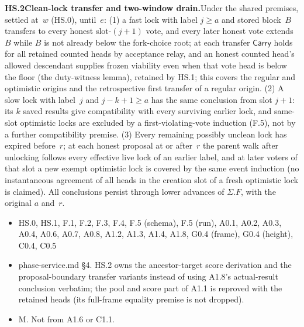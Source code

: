 \documentclass{article}
\newcommand{\dagnode}[6]{%
\par\medskip\noindent\textbf{#1\enspace #2.}\enspace #3
\begin{itemize}[leftmargin=2.2em,itemsep=0pt,topsep=2pt]
\item[\emph{Uses}] #4
\item[\emph{Evid.}] #5
\item[\emph{Task}] #6
\end{itemize}}
\begin{document}
\dagnode{HS.2}{Clean-lock transfer and two-window drain}{Under the shared
premises, settled at~$w$ (HS.0), until~$e$: (1) a fast lock with label
$j\geq a$ and stored block~$B$ transfers to every honest slot-$(j+1)$ vote,
and every later honest vote extends~$B$ while $B$ is not already below the
fork-choice root; at each transfer $\mathsf{Carry}$ holds for all retained
counted heads by acceptance relay, and an honest counted head's allowed
descendant supplies frozen viability even when that vote head is below the
floor (the duty-witness lemma), retained by HS.1; this covers the regular and
optimistic origins and the retrospective first transfer of a regular origin.
(2) A slow lock with label~$j$ and $j-k+1\geq a$ has the same conclusion from
slot $j+1$: its $k$ saved results give compatibility with every surviving
earlier lock, and same-slot optimistic locks are excluded by a
first-violating-vote induction (F.5), not by a further compatibility
premise.  (3) Every remaining possibly unclean lock has expired before~$r$; at
each honest proposal at or after~$r$ the parent walk after unlocking follows
every effective live lock of an earlier label, and at later voters of that
slot a new exempt optimistic lock is covered by the same event induction (no
instantaneous agreement of all heads in the creation slot of a fresh
optimistic lock is claimed).  All conclusions persist through lower advances
of $\Sigma.F$, with the original $a$ and~$r$.}
{HS.0, HS.1, F.1, F.2, F.3, F.4, F.5 (schema), F.5 (run), A0.1, A0.2, A0.3,
A0.4, A0.6, A0.7, A0.8, A1.2, A1.3, A1.4, A1.8, G0.4 (frame), G0.4 (height),
C0.4, C0.5}{phase-service.md \S4.  HS.2 owns the ancestor-target score
derivation and the proposal-boundary transfer variants instead of using
A1.8's actual-result conclusion verbatim; the pool and score part of A1.1 is
reproved with the retained heads (its full-frame equality premise is not
dropped).}{M.  Not from A1.6 or C1.1.}
\end{document}
